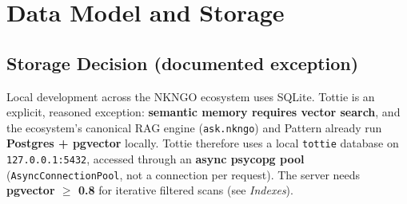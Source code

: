 \chapter{Data Model and Storage}

\section{Storage Decision (documented exception)}
Local development across the NKNGO ecosystem uses SQLite. Tottie is an explicit, reasoned
exception: \textbf{semantic memory requires vector search}, and the ecosystem's canonical RAG engine
(\texttt{ask.nkngo}) and Pattern already run \textbf{Postgres + pgvector} locally. Tottie therefore
uses a local \texttt{tottie} database on \texttt{127.0.0.1:5432}, accessed through an
\textbf{async psycopg pool} (\texttt{AsyncConnectionPool}, not a connection per request).
The server needs \textbf{pgvector $\geq$ 0.8} for iterative filtered scans (see \emph{Indexes}).

